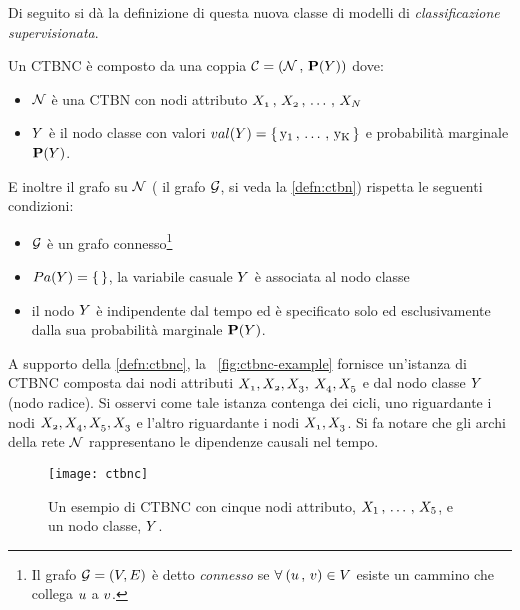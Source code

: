 Di seguito si dà la definizione di questa nuova classe di modelli di \emph{classificazione supervisionata}.
\begin{definizione}\label{defn:ctbnc}
Un \acf{CTBNC} è composto da una coppia $\mathcal{C}=(\mathcal{N}\,,\,\mathbf{P}(\mathnormal{Y}))$ dove:
\begin{itemize}
    \item $\mathcal{N}$ è una \acs{CTBN} con nodi attributo $\mathnormal{X_1}\,,\,\mathnormal{X_2}\,,\,\dotsc\,,\,\mathnormal{X_N}$
    \item $\mathnormal{Y}$ è il nodo classe con valori $val(\mathnormal{Y})=\{\,\mathrm{y_1}\,,\,\dotsc\,,\,\mathrm{y_K}\,\}$ e probabilità marginale $\mathbf{P}(\mathnormal{Y})$.
\end{itemize}
E inoltre il grafo su $\mathcal{N}$ (\ie{} il grafo $\mathcal{G}$, si veda la \autoref{defn:ctbn}) rispetta le seguenti condizioni:
\begin{itemize}
    \item $\mathcal{G}$ è un grafo connesso\footnote{Il grafo $\mathcal{G} = (\mathnormal{V}, \mathnormal{E})$ è detto \emph{connesso} se $\forall \: (\mathnormal{u}\,,\,\mathnormal{v}) \in \mathnormal{V}$ esiste un cammino che collega $\mathnormal{u}$ a $\mathnormal{v}$.}
    \item $Pa(\mathnormal{Y})=\{\,\}$, \ie{} la variabile casuale $\mathnormal{Y}$ è associata al nodo classe
    \item il nodo $\mathnormal{Y}$ è indipendente dal tempo ed è specificato solo ed esclusivamente dalla sua probabilità marginale $\mathbf{P}(\mathnormal{Y})$.
\end{itemize}
\end{definizione}
A supporto della \autoref{defn:ctbnc}, la ~\vref{fig:ctbnc-example} fornisce un'istanza di \acs{CTBNC} composta dai nodi attributi $\mathnormal{X_1},\mathnormal{X_2},\mathnormal{X_3},$ $\mathnormal{X_4},\mathnormal{X_5}$ e dal nodo classe $\mathnormal{Y}$ (nodo radice). Si osservi come tale istanza contenga dei cicli, uno riguardante i nodi $\mathnormal{X_2},\mathnormal{X_4},\mathnormal{X_5},\mathnormal{X_3}$ e l'altro riguardante i nodi $\mathnormal{X_1},\mathnormal{X_3}$. Si fa notare che gli archi della rete $\mathcal{N}$ rappresentano le dipendenze causali nel tempo.


\begin{figure}
\centering
\texttt{[image: ctbnc]}
\caption[Un esempio di \acs{CTBNC}]{Un esempio di \acf{CTBNC} con cinque nodi attributo, $\mathnormal{X}_1\,,\,\dotsc\,,\,\mathnormal{X}_5$, e un nodo classe, $\mathnormal{Y}$.}
\label{fig:ctbnc-example}
\end{figure}

